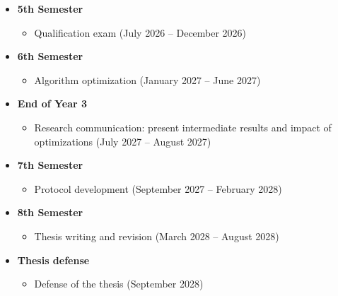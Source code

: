 \documentclass[tikz]{beamer}
\begin{document}
\begin{frame}
    \begin{itemize}
        \item \textbf{5th Semester}
        \begin{itemize}
        \item Qualification exam (July 2026 – December 2026)
        \end{itemize}

        \item \textbf{6th Semester}
        \begin{itemize}
        \item Algorithm optimization (January 2027 – June 2027)
        \end{itemize}

        \item \textbf{End of Year 3}
        \begin{itemize}
        \item Research communication: present intermediate results and impact of optimizations (July 2027 – August 2027)
        \end{itemize}
    \end{itemize}
\end{frame}

\begin{frame}
    \begin{itemize}
        \item \textbf{7th Semester}
        \begin{itemize}
        \item Protocol development (September 2027 – February 2028)
        \end{itemize}

        \item \textbf{8th Semester}
        \begin{itemize}
        \item Thesis writing and revision (March 2028 – August 2028)
        \end{itemize}

        \item \textbf{Thesis defense}
        \begin{itemize}
        \item Defense of the thesis (September 2028)
        \end{itemize}
    \end{itemize}


\end{frame}
\end{document}
